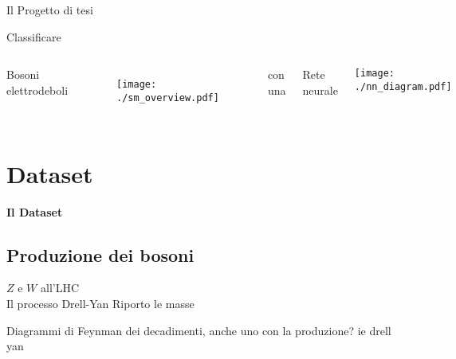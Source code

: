 \documentclass{beamer}
\begin{document}
\begin{frame}{Il Progetto di tesi}
%
%
  \vspace*{-3.5ex}
  \begin{center}
    \Large
    Classificare
  \end{center}
  \vspace*{-1.5ex}
  \begin{columns}[T]
      \begin{block}{}
        \centering%
        Bosoni elettrodeboli
      \end{block}
      \begin{figure}
        \centering
        \texttt{[image: ./sm\_overview.pdf]}
      \end{figure}

      {
        \begin{block}{}
          \centering\small
          con una
        \end{block}
      }
      \begin{block}{}
        \centering
        Rete neurale
      \end{block}
      \parbox[t][][c]{\textwidth}{
        \vspace*{3ex}
        \centering
        \texttt{[image: ./nn\_diagram.pdf]}
      }
  \end{columns}
\end{frame}

\section{Dataset}
\begin{frame}
  \centering
  \Huge\bfseries
  Il Dataset
\end{frame}

\subsection{Produzione dei bosoni}
\begin{frame}{$Z$ e $W$ all'LHC\\ Il processo Drell-Yan}
  Riporto le masse

  Diagrammi di Feynman dei decadimenti, anche uno con la produzione? ie drell yan
\end{frame}
\end{document}
